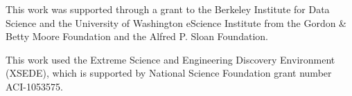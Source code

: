 




\begin{acks}

This work was supported through a grant to the Berkeley Institute for Data
Science and the University of Washington eScience Institute from the Gordon \&
Betty Moore Foundation and the Alfred P. Sloan Foundation.

This work used the Extreme Science and Engineering Discovery Environment
(XSEDE), which is supported by National Science Foundation grant number
ACI-1053575.

\end{acks}
